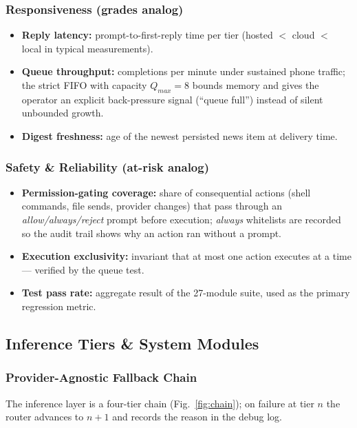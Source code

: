 \documentclass[conference]{IEEEtran}
\begin{document}
\subsubsection{Responsiveness (grades analog)}
\begin{itemize}
  \item \textbf{Reply latency:} prompt-to-first-reply time per
  tier (hosted $<$ cloud $<$ local in typical measurements).
  \item \textbf{Queue throughput:} completions per minute under
  sustained phone traffic; the strict FIFO with capacity
  $Q_{max}=8$ bounds memory and gives the operator an explicit
  back-pressure signal (``queue full'') instead of silent
  unbounded growth.
  \item \textbf{Digest freshness:} age of the newest persisted
  news item at delivery time.
\end{itemize}

\subsubsection{Safety \& Reliability (at-risk analog)}
\begin{itemize}
  \item \textbf{Permission-gating coverage:} share of
  consequential actions (shell commands, file sends, provider
  changes) that pass through an \emph{allow/always/reject}
  prompt before execution; \emph{always} whitelists are recorded
  so the audit trail shows why an action ran without a prompt.
  \item \textbf{Execution exclusivity:} invariant that at most
  one action executes at a time --- verified by the queue test.
  \item \textbf{Test pass rate:} aggregate result of the
  27-module suite, used as the primary regression metric.
\end{itemize}

\subsection{Inference Tiers \& System Modules}

\subsubsection{Provider-Agnostic Fallback Chain}

The inference layer is a four-tier chain
(Fig.~\ref{fig:chain}); on failure at tier $n$ the router
advances to $n{+}1$ and records the reason in the debug log.
\end{document}
